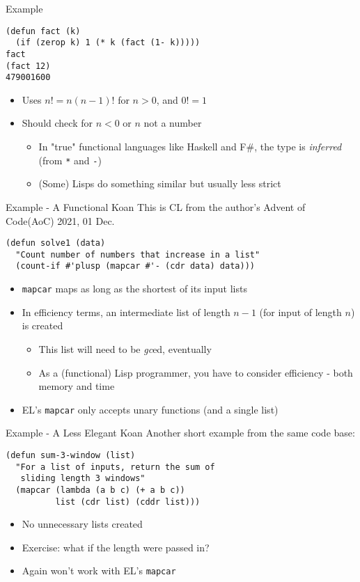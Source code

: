 \documentclass[presentation]{beamer}
\begin{document}
\begin{frame}[fragile]{Example}
\label{sec:org25d9a35}

\begin{verbatim}
(defun fact (k)
  (if (zerop k) 1 (* k (fact (1- k)))))
fact
(fact 12)
479001600
\end{verbatim}
\begin{itemize}
\item Uses \(n!=n(n-1)!\) for \(n>0\), and \(0!=1\)
\item Should check for \(n<0\) or \(n\) not a number
\begin{itemize}
\item In "true" functional languages like Haskell and F\#, the type is \emph{inferred} (from \texttt{*} and \texttt{-})
\item (Some) Lisps do something similar but usually less strict
\end{itemize}
\end{itemize}

\end{frame}
\begin{frame}[fragile]{Example - A Functional Koan}
  This is CL from the author's Advent of Code(AoC) 2021, 01 Dec.
\begin{verbatim}
(defun solve1 (data)
  "Count number of numbers that increase in a list"
  (count-if #'plusp (mapcar #'- (cdr data) data)))
\end{verbatim}
\begin{itemize}
\item \texttt{mapcar} maps as long as the shortest of its input lists
\item In efficiency terms, an intermediate list of length $n-1$ (for input of length $n$) is created
  \begin{itemize}
  \item This list will need to be \emph{gc}ed, eventually
  \item As a (functional) Lisp programmer, you have to consider efficiency - both memory and time
  \end{itemize}
\item EL's \texttt{mapcar} only accepts unary functions (and a single list)
\end{itemize}
\end{frame}
\begin{frame}[fragile]{Example - A Less Elegant Koan}
Another short example from the same code base:
\begin{verbatim}
(defun sum-3-window (list)
  "For a list of inputs, return the sum of
   sliding length 3 windows"
  (mapcar (lambda (a b c) (+ a b c))
          list (cdr list) (cddr list)))
\end{verbatim}
\begin{itemize}
\item No unnecessary lists created
\item Exercise: what if the length were passed in?
\item Again won't work with EL's \texttt{mapcar}
\end{itemize}
\end{frame}
\end{document}
